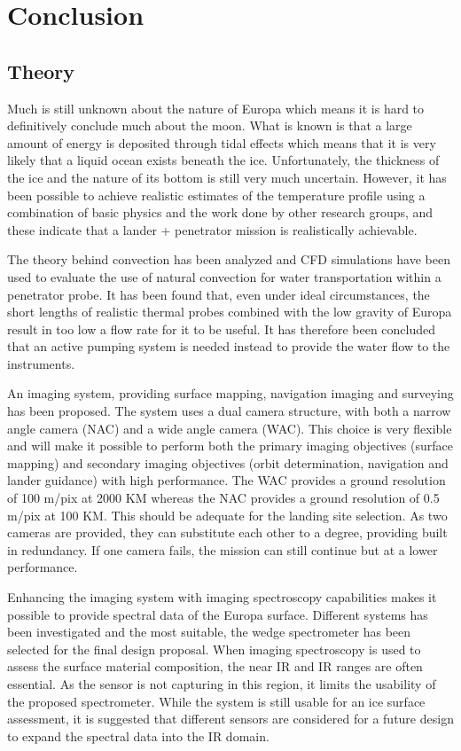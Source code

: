 \chapter{Conclusion}
\section{Theory}
Much is still unknown about the nature of Europa which means it is hard to definitively conclude much about the moon. What is known is that a large amount of energy is deposited through tidal effects which means that it is very likely that a liquid ocean exists beneath the ice. Unfortunately, the thickness of the ice and the nature of its bottom is still very much uncertain. However, it has been possible to achieve realistic estimates of the temperature profile using a combination of basic physics and the work done by other research groups, and these indicate that a lander + penetrator mission is realistically achievable. 

The theory behind convection has been analyzed and CFD simulations have been used to evaluate the use of natural convection for water transportation within a penetrator probe. It has been found that, even under ideal circumstances, the short lengths of realistic thermal probes combined with the low gravity of Europa result in too low a flow rate for it to be useful. It has therefore been concluded that an active pumping system is needed instead to provide the water flow to the instruments.

An imaging system, providing surface mapping, navigation imaging and surveying has been proposed. The system uses a dual camera structure, with both a narrow angle camera (NAC) and a wide angle camera (WAC). This choice is very flexible and will make it possible to perform both the primary imaging objectives (surface mapping) and secondary imaging objectives (orbit determination, navigation and lander guidance) with high performance. The WAC provides a ground resolution of 100 m/pix at 2000 KM whereas the NAC provides a ground resolution of 0.5 m/pix at 100 KM. This should be adequate for the landing site selection. As two cameras are provided, they can substitute each other to a degree, providing built in redundancy. If one camera fails, the mission can still continue but at a lower performance.

Enhancing the imaging system with imaging spectroscopy capabilities makes it possible to provide spectral data of the Europa surface. Different systems has been investigated and the most suitable, the wedge spectrometer has been selected for the final design proposal. When imaging spectroscopy is used to assess the surface material composition, the near IR and IR ranges are often essential. As the sensor is not capturing in this region, it limits the usability of the proposed spectrometer. While the system is still usable for an ice surface assessment, it is suggested that different sensors are considered for a future design to expand the spectral data into the IR domain.

